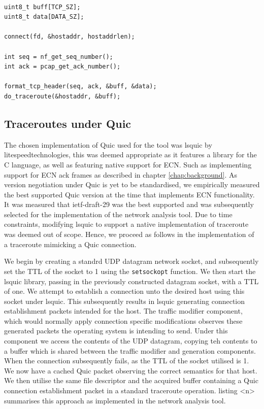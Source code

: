 \documentclass{l4proj}
\begin{document}
\begin{lstlisting}[caption={A demonstration of launching traceroutes during a TCP connection, implementation details such as the use of synchronisation primitives and error checking have been omitted for the sake of brevity}]

uint8_t buff[TCP_SZ];
uint8_t data[DATA_SZ];

connect(fd, &hostaddr, hostaddrlen);

int seq = nf_get_seq_number();
int ack = pcap_get_ack_number();

format_tcp_header(seq, ack, &buff, &data);
do_traceroute(&hostaddr, &buff);

\end{lstlisting}


\subsection{Traceroutes under Quic}

The chosen implementation of Quic used for the tool was lsquic by litespeedtechnologies, this was deemed appropriate as it features a library for the C language, as well as featuring native support for ECN. Such as implementing support for ECN ack frames as described in chapter \ref{chap:background}. As version negotiation under Quic is yet to be standardised, we empirically measured the best supported Quic version at the time that implements ECN functionality. It was measured that ietf-draft-29 was the best supported and was subsequently selected for the implementation of the network analysis tool. Due to time constraints, modifying lsquic to support a native implementation of traceroute was deemed out of scope. Hence, we proceed as follows in the implementation of a traceroute mimicking a Quic connection. 

We begin by creating a standrd UDP datagram network socket, and subsequently set the TTL of the socket to 1 using the \lstinline{setsockopt} function. We then start the lsquic library, passing in the previously constructed datagram socket, with a TTL of one. We attempt to establish a connection unto the desired host using this socket under lsquic. This subsequently results in lsquic generating connection establishment packets intended for the host. The traffic modifier component, which would normally apply connection specific modifications observes these generated packets the operating system is intending to send. Under this component we access the contents of the UDP datagram, copying teh contents to a buffer which is shared between the traffic modifier and generation components. When the connection subsequently fails, as the TTL of the socket utilised is 1. We now have a cached Quic packet observing the correct semantics for that host. We then utilise the same file descriptor and the acquired buffer containing a Quic connection establishment packet in a standard traceroute operation. listing <n> summarises this approach as implemented in the network analysis tool.
\end{document}
